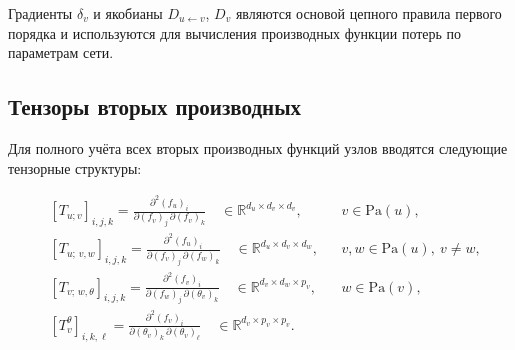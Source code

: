 \documentclass[11pt]{article}
\newcommand{\Pa}{\mathrm{Pa}} %
\begin{document}
Градиенты $\delta_v$ и якобианы $D_{u\gets v}$, $D_v$ являются основой цепного правила первого порядка и
используются для вычисления производных функции потерь по параметрам сети.

\subsection{Тензоры вторых производных}

Для полного учёта всех вторых производных функций узлов вводятся следующие тензорные структуры:

\begin{align*}
  &[T_{u;v}]_{i,j,k}
  = \frac{\partial^2 (f_u)_i}{\partial(f_v)_j\,\partial(f_v)_k}
  \quad\in\mathbb{R}^{d_u\times d_v\times d_v},
  &&v\in\Pa(u),
  \\[3pt]
  &[T_{u;\,v,w}]_{i,j,k}
  = \frac{\partial^2 (f_u)_i}{\partial(f_v)_j\,\partial(f_w)_k}
  \quad\in\mathbb{R}^{d_u\times d_v\times d_w},
  &&v,w\in\Pa(u),\ v\neq w,
  \\[3pt]
  &[T_{v;\,w,\theta}]_{i,j,k}
  = \frac{\partial^2 (f_v)_i}{\partial(f_w)_j\,\partial(\theta_v)_k}
  \quad\in\mathbb{R}^{d_v\times d_w\times p_v},
  &&w\in\Pa(v),
  \\[3pt]
  &[T_v^\theta]_{i,k,\ell}
  = \frac{\partial^2 (f_v)_i}{\partial(\theta_v)_k\,\partial(\theta_v)_\ell}
  \quad\in\mathbb{R}^{d_v\times p_v\times p_v}.
\end{align*}
\end{document}
